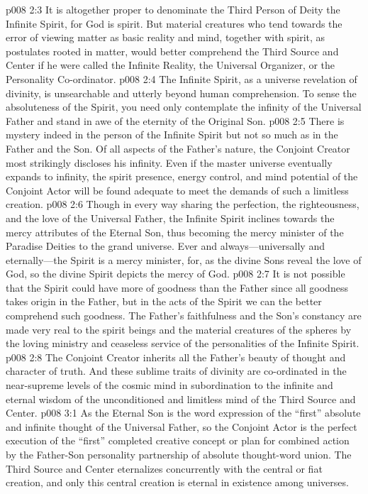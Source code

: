 \vs p008 2:3 It is altogether proper to denominate the Third Person of Deity the Infinite Spirit, for God is spirit. But material creatures who tend towards the error of viewing matter as basic reality and mind, together with spirit, as postulates rooted in matter, would better comprehend the Third Source and Center if he were called the Infinite Reality, the Universal Organizer, or the Personality Co\hyp{}ordinator.
\pc \vs p008 2:4 The Infinite Spirit, as a universe revelation of divinity, is unsearchable and utterly beyond human comprehension. To sense the absoluteness of the Spirit, you need only contemplate the infinity of the Universal Father and stand in awe of the eternity of the Original Son.
\pc \vs p008 2:5 There is mystery indeed in the person of the Infinite Spirit but not so much as in the Father and the Son. Of all aspects of the Father’s nature, the Conjoint Creator most strikingly discloses his infinity. Even if the master universe eventually expands to infinity, the spirit presence, energy control, and mind potential of the Conjoint Actor will be found adequate to meet the demands of such a limitless creation.
\vs p008 2:6 Though in every way sharing the perfection, the righteousness, and the love of the Universal Father, the Infinite Spirit inclines towards the mercy attributes of the Eternal Son, thus becoming the mercy minister of the Paradise Deities to the grand universe. Ever and always---universally and eternally---the Spirit is a mercy minister, for, as the divine Sons reveal the love of God, so the divine Spirit depicts the mercy of God.
\vs p008 2:7 It is not possible that the Spirit could have more of goodness than the Father since all goodness takes origin in the Father, but in the acts of the Spirit we can the better comprehend such goodness. The Father’s faithfulness and the Son’s constancy are made very real to the spirit beings and the material creatures of the spheres by the loving ministry and ceaseless service of the personalities of the Infinite Spirit.
\vs p008 2:8 The Conjoint Creator inherits all the Father’s beauty of thought and character of truth. And these sublime traits of divinity are co\hyp{}ordinated in the near\hyp{}supreme levels of the cosmic mind in subordination to the infinite and eternal wisdom of the unconditioned and limitless mind of the Third Source and Center.
\vs p008 3:1 As the Eternal Son is the word expression of the “first” absolute and infinite thought of the Universal Father, so the Conjoint Actor is the perfect execution of the “first” completed creative concept or plan for combined action by the Father\hyp{}Son personality partnership of absolute thought\hyp{}word union. The Third Source and Center eternalizes concurrently with the central or fiat creation, and only this central creation is eternal in existence among universes.
